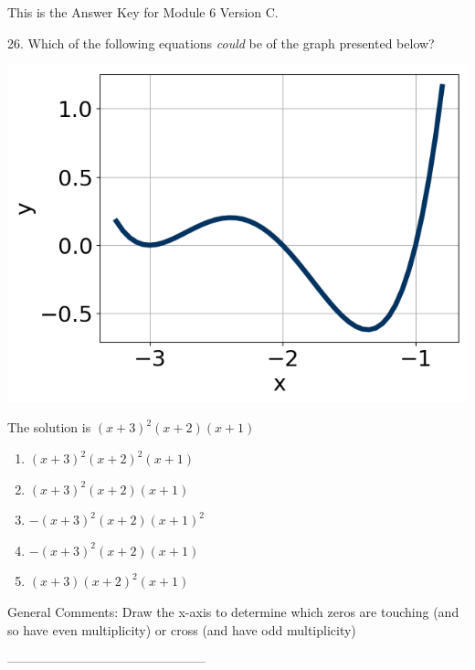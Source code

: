 \documentclass{article}[10pt]
\begin{document}
This is the Answer Key for Module 6 Version C.

26. Which of the following equations \textit{could} be of the graph presented below?
$$  $$ 
\begin{center}\includegraphics[scale=0.5]{../Figures/question26C.png}\end{center}The solution is $ (x + 3)^2(x + 2)(x + 1) $ 

\begin{enumerate}[label=\Alph*.] 
\item $ (x + 3)^2(x + 2)^2(x + 1) $ 

  
\item $ (x + 3)^2(x + 2)(x + 1) $ 

  
\item $ -(x + 3)^2(x + 2)(x + 1)^2 $ 

  
\item $ -(x + 3)^2(x + 2)(x + 1) $ 

  
\item $ (x + 3)(x + 2)^2(x + 1) $ 

  
\end{enumerate} 
 
General Comments: Draw the x-axis to determine which zeros are touching (and so have even multiplicity) or cross (and have odd multiplicity)

-----------------------------------------------
\end{document}

